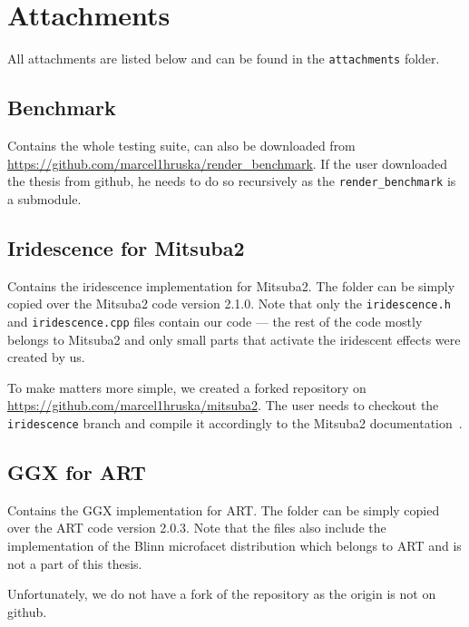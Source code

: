 \documentclass[12pt,a4paper]{report}
\let\openright=\clearpage
\begin{document}
\chapter{Attachments}

All attachments are listed below and can be found in the \texttt{attachments} folder. 

\section{Benchmark}
\label{sec:benchmark}

Contains the whole testing suite, can also be downloaded from \url{https://github.com/marcel1hruska/render_benchmark}. If the user downloaded the thesis from github, he needs to do so recursively as the \texttt{render\_benchmark} is a submodule.

\section{Iridescence for Mitsuba2}
\label{sec:mitsuba2_irid}

Contains the iridescence implementation for Mitsuba2. The folder can be simply copied over the Mitsuba2 code version 2.1.0. Note that only the \texttt{iridescence.h} and \texttt{iridescence.cpp} files contain our code --- the rest of the code mostly belongs to Mitsuba2 and only small parts that activate the iridescent effects were created by us. 

To make matters more simple, we created a forked repository on \url{https://github.com/marcel1hruska/mitsuba2}. The user needs to checkout the \\ \texttt{iridescence} branch and compile it accordingly to the Mitsuba2 documentation~\cite{mitsubaWeb}.

\section{GGX for ART}
\label{sec:ggx_art}

Contains the GGX implementation for ART. The folder can be simply copied over the ART code version 2.0.3. Note that the files also include the implementation of the Blinn microfacet distribution which belongs to ART and is not a part of this thesis. 

Unfortunately, we do not have a fork of the repository as the origin is not on github.

\openright
\end{document}
